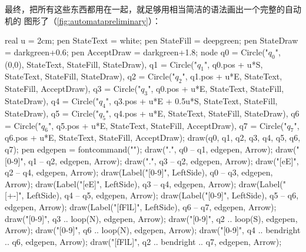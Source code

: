 最终，把所有这些东西都用在一起，就足够用相当简洁的语法画出一个完整的自动机的
图形了（\autoref{fig:automatapreliminary}）：
\begin{asycode}
real u = 2cm;
pen StateText = white;
pen StateFill = deepgreen;
pen StateDraw = darkgreen+0.6;
pen AcceptDraw = darkgreen+1.8;
node q0 = Circle("$q_0$", (0,0), StateText, StateFill, StateDraw),
     q1 = Circle("$q_1$", q0.pos + u*S, StateText, StateFill, StateDraw),
     q2 = Circle("$q_2$", q1.pos + u*E, StateText, StateFill, AcceptDraw),
     q3 = Circle("$q_3$", q0.pos + u*E, StateText, StateFill, StateDraw),
     q4 = Circle("$q_4$", q3.pos + u*E + 0.5u*S, StateText, StateFill, StateDraw),
     q5 = Circle("$q_5$", q4.pos + u*E, StateText, StateFill, StateDraw),
     q6 = Circle("$q_6$", q5.pos + u*E, StateText, StateFill, AcceptDraw),
     q7 = Circle("$q_7$", q6.pos + u*E, StateText, StateFill, AcceptDraw);
draw(q0, q1, q2, q3, q4, q5, q6, q7);
pen edgepen = fontcommand("\scriptsize\ttfamily");
draw(".",     q0 -- q1, edgepen, Arrow);
draw("[0-9]", q1 -- q2, edgepen, Arrow);
draw(".",     q3 -- q2, edgepen, Arrow);
draw("[eE]",  q2 -- q4, edgepen, Arrow);
draw(Label("[0-9]", LeftSide),  q0 -- q3, edgepen, Arrow);
draw(Label("[eE]", LeftSide),   q3 -- q4, edgepen, Arrow);
draw(Label("[+-]", LeftSide),   q4 -- q5, edgepen, Arrow);
draw(Label("[0-9]", LeftSide),  q5 -- q6, edgepen, Arrow);
draw(Label("[fFlL]", LeftSide), q6 -- q7, edgepen, Arrow);
draw("[0-9]", q3 .. loop(N), edgepen, Arrow);
draw("[0-9]", q2 .. loop(S), edgepen, Arrow);
draw("[0-9]", q6 .. loop(N), edgepen, Arrow);
draw("[0-9]",  q4 .. bendright .. q6, edgepen, Arrow);
draw("[fFlL]", q2 .. bendright .. q7, edgepen, Arrow);
\end{asycode}
